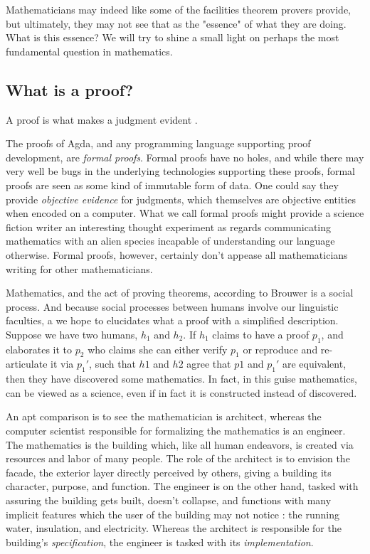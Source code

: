 Mathematicians may indeed like some of the facilities theorem provers provide,
but ultimately, they may not see that as the "essence" of what they are doing.
What is this essence? We will try to shine a small light on perhaps the most
fundamental question in mathematics.

\subsection{What is a proof?}

\begin{displayquote}

A proof is what makes a judgment evident \cite{mlMeanings}.

\end{displayquote}

The proofs of Agda, and any programming language supporting proof development,
are \emph{formal proofs}. Formal proofs have no holes, and while there may very
well be bugs in the underlying technologies supporting these proofs, formal
proofs are seen as some kind of immutable form of data. One could say they
provide \emph{objective evidence} for judgments, which themselves are objective
entities when encoded on a computer. What we call formal proofs might provide a
science fiction writer an interesting thought experiment as regards
communicating mathematics with an alien species incapable of understanding our
language otherwise. Formal proofs, however, certainly don't appease all
mathematicians writing for other mathematicians.

Mathematics, and the act of proving theorems, according to Brouwer is a social
process. And because social processes between humans involve our linguistic
faculties, a we hope to elucidates what a proof with a simplified description.
Suppose we have two humans, $h_1$ and $h_2$. If $h_1$ claims to have a proof
$p_1$, and elaborates it to $p_2$ who claims she can either verify $p_1$ or
reproduce and re-articulate it via $p_1'$, such that $h1$ and $h2$ agree that
$p1$ and $p_1'$ are equivalent, then they have discovered some mathematics. In
fact, in this guise mathematics, can be viewed as a science, even if in fact it
is constructed instead of discovered.

An apt comparison is to see the mathematician is architect, whereas the computer
scientist responsible for formalizing the mathematics is an engineer. The
mathematics is the building which, like all human endeavors, is created via
resources and labor of many people. The role of the architect is to envision the
facade, the exterior layer directly perceived by others, giving a building its
character, purpose, and function. The engineer is on the other hand, tasked with
assuring the building gets built, doesn't collapse, and functions with many
implicit features which the user of the building may not notice : the running
water, insulation, and electricity. Whereas the architect is responsible for the
building's \emph{specification}, the engineer is tasked with its
\emph{implementation}.


